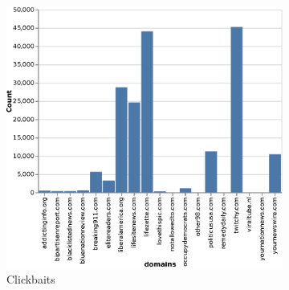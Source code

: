 \begin{figure}[!ht]
     \centering
     \begin{subfigure}[b]{0.3\textwidth}
         \centering
         \includegraphics[width=\textwidth, height=0.3\textheight]{images/data_exploration/clickbait.eps}
         \caption{Clickbaits}
     \end{subfigure}
     \hfill
     \begin{subfigure}[b]{0.3\textwidth}
         \centering

\end{subfigure}
\end{figure}
